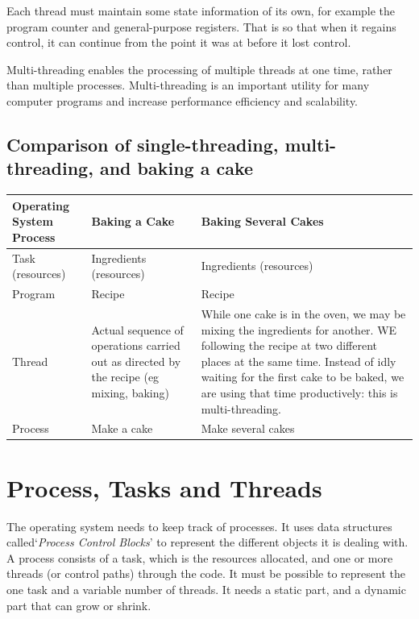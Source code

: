 Each thread must maintain some state information of its own, for example the program counter and general-purpose registers. That is so that when it regains control, it can continue from the point it was at before it lost control. 

Multi-threading enables the processing of multiple threads at one time, rather than multiple processes. Multi-threading is an important utility for many computer programs and increase performance efficiency and scalability.

\subsection*{Comparison of single-threading, multi-threading, and baking a cake}

\begin{table}[H]
    \centering
    \begin{tabular}{p{} p{} p{}}
        \textbf{Operating System Process} & \textbf{Baking a Cake} & \textbf{Baking Several Cakes}\\
        \hline
        \hline
        Task (resources) & Ingredients (resources) & Ingredients (resources)\\
        \hline
        Program & Recipe & Recipe \\
        \hline
        Thread & Actual sequence of operations carried out as directed by the recipe (eg mixing, baking) & While one cake is in the oven, we may be mixing the ingredients for another. WE following the recipe at two different places at the same time. Instead of idly waiting for the first cake to be baked, we are using that time productively: this is multi-threading.\\
        \hline
        Process & Make a cake & Make several cakes\\
        \hline
    \end{tabular}
\end{table}

\section*{Process, Tasks and Threads}
The operating system needs to keep track of processes. It uses data structures called`\textit{Process Control Blocks}' to represent the different objects it is dealing with. A process consists of a task, which is the resources allocated, and one or more threads (or control paths) through the code. It must be possible to represent the one task and a variable number of threads. It needs a static part, and a dynamic part that can grow or shrink. 
